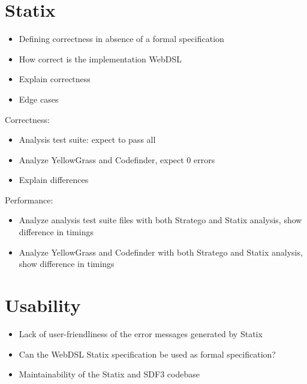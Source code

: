 \section{\label{sec:eval-statix}Statix}

  \begin{itemize}
    \item Defining correctness in absence of a formal specification
    \item How correct is the implementation WebDSL
    \item Explain correctness
    \item Edge cases
  \end{itemize}

  Correctness:

  \begin{itemize}
    \item Analysis test suite: expect to pass all
    \item Analyze YellowGrass and Codefinder, expect 0 errors
    \item Explain differences
  \end{itemize}

  Performance:

  \begin{itemize}
    \item Analyze analysis test suite files with both Stratego and Statix analysis, show difference in timings
    \item Analyze YellowGrass and Codefinder with both Stratego and Statix analysis, show difference in timings
  \end{itemize}

\section{\label{sec:usability}Usability}

  \begin{itemize}
    \item Lack of user-friendliness of the error messages generated by Statix
    \item Can the WebDSL Statix specification be used as formal specification?
    \item Maintainability of the Statix and SDF3 codebase
  \end{itemize}
